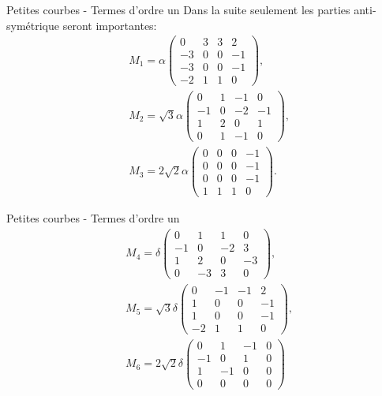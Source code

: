 \documentclass[10pt, envcountsect]{beamer}
\theoremstyle{plain}
\begin{document}
\begin{frame}{Petites courbes - Termes d'ordre un}
Dans la suite seulement les parties anti-symétrique seront importantes:
\renewcommand{\arraystretch}{0.7}
\begin{align}
\label{eq: M1 and M2}
&M_1 = \alpha \left ( \begin{array}{cccc}
0 & 3 & 3 & 2 \\ 
-3 & 0 & 0 & -1 \\ 
-3 & 0 & 0 & -1 \\ 
-2 & 1 & 1 & 0
\end{array} \right ) ,\\
&M_2 = \sqrt{3} \alpha \left (
\begin{array}{cccc}
0 & 1 & -1 & 0 \\ 
-1 & 0 & -2 & -1 \\ 
1 & 2 & 0 & 1 \\ 
0 & 1 & -1 & 0
\end{array} \right),\\
&M_3 = 2 \sqrt{2} \alpha \left (
\begin{array}{cccc}
0 & 0 & 0 & -1 \\ 
0 & 0 & 0 & -1 \\ 
0 & 0 & 0 & -1 \\ 
1 & 1 & 1 & 0
\end{array} 
\right ).
\end{align}
\renewcommand{\arraystretch}{1}
\end{frame}

\begin{frame}{Petites courbes - Termes d'ordre un}
\renewcommand{\arraystretch}{0.7}
\begin{align}
\label{eq: M4 and M5}
	&M_4 = \delta \left (
	\begin{array}{cccc}
	0 & 1 & 1 & 0 \\ 
	-1 & 0 & -2 & 3 \\ 
	1 & 2 & 0 & -3 \\ 
	0 & -3 & 3 & 0
	\end{array} 
	\right ),\\
	&M_5 = \sqrt{3} \delta \left ( \begin{array}{cccc}
	0 & -1 & -1 & 2 \\ 
	1 & 0 & 0 & -1 \\ 
	1 & 0 & 0 & -1 \\ 
	-2 & 1 & 1 & 0
	\end{array} \right ) ,\\
&M_6 = 2 \sqrt{2} \delta \left (\begin{array}{cccc}
0 & 1 & -1 & 0 \\ 
-1 & 0 & 1 & 0 \\ 
1 & -1 & 0 & 0 \\ 
0 & 0 & 0 & 0
\end{array}  \right )
\end{align}
\renewcommand{\arraystretch}{1}
\end{frame}
\end{document}
